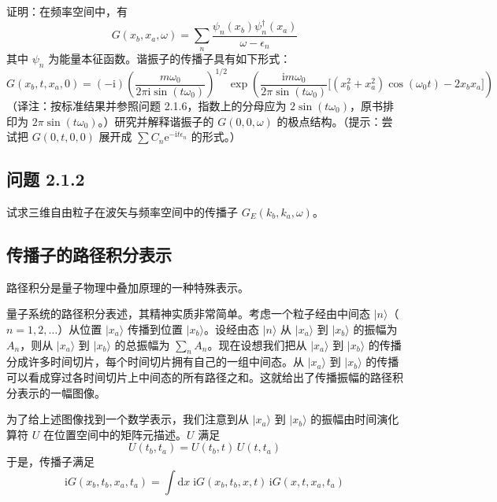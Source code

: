 证明：在频率空间中，有
\begin{equation*}
G(x_b,x_a,\omega) = \sum_n \frac{\psi_n(x_b)\psi_n^{\dagger}(x_a)}{\omega-\epsilon_n}
\end{equation*}
其中 $\psi_n$ 为能量本征函数。谐振子的传播子具有如下形式：
\begin{equation*}
G(x_b,t,x_a,0) = (-\mathrm{i})\left(\frac{m\omega_0}{2\pi\mathrm{i}\sin(t\omega_0)}\right)^{1/2} \exp\left(\frac{\mathrm{i}m\omega_0}{2\pi\sin(t\omega_0)}\big[(x_b^2+x_a^2)\cos(\omega_0 t) - 2x_bx_a\big]\right)
\end{equation*}
（译注：按标准结果并参照问题 2.1.6，指数上的分母应为 $2\sin(t\omega_0)$，原书排印为 $2\pi\sin(t\omega_0)$。）研究并解释谐振子的 $G(0,0,\omega)$ 的极点结构。（提示：尝试把 $G(0,t,0,0)$ 展开成 $\sum C_n\mathrm{e}^{-\mathrm{i}t\epsilon_n}$ 的形式。）

\subsection*{问题 2.1.2}

试求三维自由粒子在波矢与频率空间中的传播子 $G_E(k_b,k_a,\omega)$。

\subsection{传播子的路径积分表示}

\begin{keypoints}
\item 路径积分是量子物理中叠加原理的一种特殊表示。
\end{keypoints}

量子系统的路径积分表述，其精神实质非常简单。考虑一个粒子经由中间态 $|n\rangle$（$n = 1, 2, \dots$）从位置 $|x_a\rangle$ 传播到位置 $|x_b\rangle$。设经由态 $|n\rangle$ 从 $|x_a\rangle$ 到 $|x_b\rangle$ 的振幅为 $A_n$，则从 $|x_a\rangle$ 到 $|x_b\rangle$ 的总振幅为 $\sum_n A_n$。现在设想我们把从 $|x_a\rangle$ 到 $|x_b\rangle$ 的传播分成许多时间切片，每个时间切片拥有自己的一组中间态。从 $|x_a\rangle$ 到 $|x_b\rangle$ 的传播可以看成穿过各时间切片上中间态的所有路径之和。这就给出了传播振幅的路径积分表示的一幅图像。

为了给上述图像找到一个数学表示，我们注意到从 $|x_a\rangle$ 到 $|x_b\rangle$ 的振幅由时间演化算符 $U$ 在位置空间中的矩阵元描述。$U$ 满足
\begin{equation*}
U(t_b,t_a) = U(t_b,t)\,U(t,t_a)
\end{equation*}
于是，传播子满足
\begin{equation*}
\mathrm{i}G(x_b,t_b,x_a,t_a) = \int \mathrm{d}x\; \mathrm{i}G(x_b,t_b,x,t)\,\mathrm{i}G(x,t,x_a,t_a) \tag{2.1.4}
\end{equation*}

